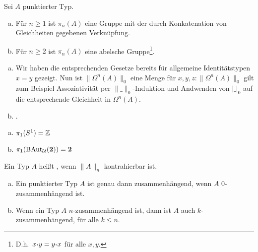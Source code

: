 \begin{bemerkung}
  Sei \(A\) punktierter Typ.
  \begin{enumerate}[(a)]
  \item Für \(n\geq 1\) ist \(\pi_n(A)\) eine Gruppe mit der durch Konkatenation von Gleichheiten gegebenen Verknüpfung.
  \item Für \(n\geq 2\) ist \(\pi_n(A)\) eine abelsche Gruppe\footnote{D.h.\ \(x\kon y=y\kon x\) für alle \(x,y\).}.
  \end{enumerate}
\end{bemerkung}

\begin{beweis}
  \begin{enumerate}[(a)]
  \item Wir haben die entsprechenden Gesetze bereits für allgemeine Identitätstypen \(x=y\) gezeigt.
    Nun ist \(\|\Omega^n(A)\|_0\) eine Menge für \(x,y,z:\|\Omega^n(A)\|_0\) gilt zum Beispiel Assoziativität per \(\|\_\|_0\)-Induktion und Andwenden von \(|\_|_0\) auf die entsprechende Gleichheit in \(\Omega^n(A)\).
  \item {}.
  \end{enumerate}
\end{beweis}

\begin{beispiel}
  \begin{enumerate}[(a)]
  \item \(\pi_1(S^1)=\mathbb{Z}\)
  \item \(\pi_1(\mathrm{BAut}_{\mathcal{U}}(\mathbf{2}))=\mathbf{2}\)
  \end{enumerate}
\end{beispiel}

\begin{definition}
  Ein Typ \(A\) heißt , wenn \(\|A\|_n\) kontrahierbar ist.
\end{definition}

\begin{bemerkung}
  \begin{enumerate}[(a)]
  \item Ein punktierter Typ \(A\) ist genau dann zusammenhängend, wenn \(A\) \(0\)-zusammenhängend ist.
  \item Wenn ein Typ \(A\) \(n\)-zusammenhängend ist, dann ist \(A\) auch \(k\)-zusammenhängend, für alle \(k\leq n\).
  \end{enumerate}
\end{bemerkung}

